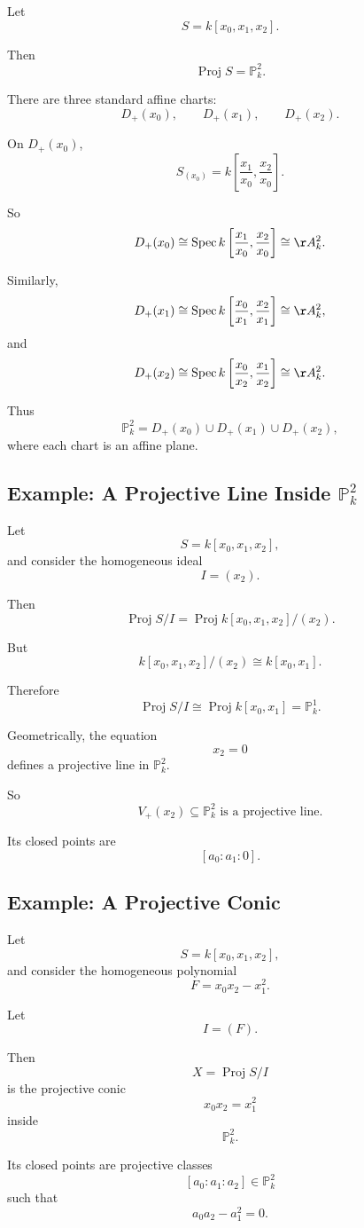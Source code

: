 \documentclass[12pt,a4paper]{article}
\DeclareMathOperator{\Spec}{Spec}
\DeclareMathOperator{\Proj}{Proj}
\newcommand{\PP}{\mathbb P}
\theoremstyle{notespace}
\begin{document}
Let
\[
S=k[x_0,x_1,x_2].
\]

Then
\[
\Proj S=\PP_k^2.
\]

There are three standard affine charts:
\[
D_+(x_0),\qquad D_+(x_1),\qquad D_+(x_2).
\]

On \(D_+(x_0)\),
\[
S_{(x_0)}
=
k\left[
\frac{x_1}{x_0},
\frac{x_2}{x_0}
\right].
\]

So
\[
D_+(x_0)
\cong
\Spec k\left[
\frac{x_1}{x_0},
\frac{x_2}{x_0}
\right]
\cong
\AA_k^2.
\]

Similarly,
\[
D_+(x_1)
\cong
\Spec k\left[
\frac{x_0}{x_1},
\frac{x_2}{x_1}
\right]
\cong
\AA_k^2,
\]
and
\[
D_+(x_2)
\cong
\Spec k\left[
\frac{x_0}{x_2},
\frac{x_1}{x_2}
\right]
\cong
\AA_k^2.
\]

Thus
\[
\boxed{
	\PP_k^2
	=
	D_+(x_0)\cup D_+(x_1)\cup D_+(x_2),
}
\]
where each chart is an affine plane.

\subsection{Example: A Projective Line Inside \texorpdfstring{$\PP_k^2$}{P2}}

Let
\[
S=k[x_0,x_1,x_2],
\]
and consider the homogeneous ideal
\[
I=(x_2).
\]

Then
\[
\Proj S/I
=
\Proj k[x_0,x_1,x_2]/(x_2).
\]

But
\[
k[x_0,x_1,x_2]/(x_2)
\cong
k[x_0,x_1].
\]

Therefore
\[
\Proj S/I
\cong
\Proj k[x_0,x_1]
=
\PP_k^1.
\]

Geometrically, the equation
\[
x_2=0
\]
defines a projective line in \(\PP_k^2\).

So
\[
\boxed{
	V_+(x_2)\subseteq \PP_k^2
	\text{ is a projective line.}
}
\]

Its closed points are
\[
[a_0:a_1:0].
\]

\subsection{Example: A Projective Conic}

Let
\[
S=k[x_0,x_1,x_2],
\]
and consider the homogeneous polynomial
\[
F=x_0x_2-x_1^2.
\]

Let
\[
I=(F).
\]

Then
\[
X=\Proj S/I
\]
is the projective conic
\[
x_0x_2=x_1^2
\]
inside
\[
\PP_k^2.
\]

Its closed points are projective classes
\[
[a_0:a_1:a_2]\in \PP_k^2
\]
such that
\[
a_0a_2-a_1^2=0.
\]
\end{document}
